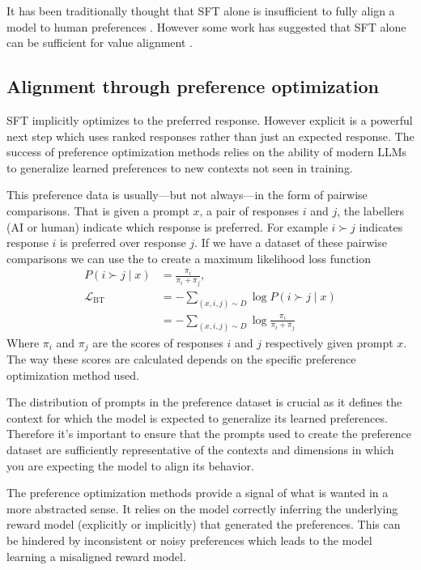 It has been traditionally thought that SFT alone is insufficient to fully align a model to human preferences \cite{ouyangTrainingLanguageModels2022,baiConstitutionalAIHarmlessness2022}. However some work has suggested that SFT alone can be sufficient for value alignment \cite{nieSurveytoBehaviorDownstreamAlignment2025,zhouLIMALessMore2023}.

\subsection{Alignment through preference optimization}

SFT implicitly optimizes to the preferred response. However explicit  is a powerful next step which uses ranked responses rather than just an expected response. The success of preference optimization methods relies on the ability of modern LLMs to generalize learned preferences to new contexts not seen in training.

This preference data is usually—but not always—in the form of pairwise comparisons. That is given a prompt $x$, a pair of responses $i$ and $j$, the labellers (AI or human) indicate which response is preferred. For example $i \succ j$ indicates response $i$ is preferred over response $j$. If we have a dataset of these pairwise comparisons we can use the  \cite{bradleyRANKANALYSISINCOMPLETE1952} to create a maximum likelihood loss function
\begin{align}
    P(i \succ j \mid x) &= \frac{\pi_i}{\pi_i + \pi_j}, \\
    \mathcal{L}_{\mathrm{BT}} &= - \sum_{(x, i, j) \sim D} \log P(i \succ j \mid x) \\
    &= - \sum_{(x, i, j) \sim D} \log \frac{\pi_i}{\pi_i + \pi_j} \label{eq:bradley-terry-loss}
\end{align}
Where $\pi_i$ and $\pi_j$ are the scores of responses $i$ and $j$ respectively given prompt $x$. The way these scores are calculated depends on the specific preference optimization method used.

The distribution of prompts in the preference dataset is crucial as it defines the context for which the model is expected to generalize its learned preferences. Therefore it's important to ensure that the prompts used to create the preference dataset are sufficiently representative of the contexts and dimensions in which you are expecting the model to align its behavior.

The preference optimization methods provide a signal of what is wanted in a more abstracted sense. It relies on the model correctly inferring the underlying reward model (explicitly or implicitly) that generated the preferences. This can be hindered by inconsistent or noisy preferences which leads to the model learning a misaligned reward model.

